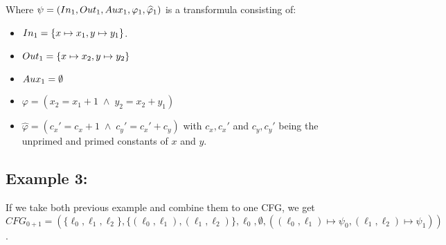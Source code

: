 \documentclass{article}
\begin{document}
	Where $\psi = (In_1, Out_1, Aux_1, \varphi_1, \widehat{\varphi}_1)$ is a transformula consisting of: 
	\begin{itemize}
		\item $In_1 = \{x \mapsto x_1, y \mapsto y_1 \}$.
		\item $Out_1 = \{ x \mapsto x_2, y \mapsto y_2 \}$
		\item $Aux_1 = \emptyset $
		\item $	\varphi = ( x_{2} = x_{1} + 1 \; \land \; y_{2} = x_{2} + y_{1} ) $
		\item $\widehat{\varphi} = ( c_{x}' = c_x + 1 \;\land\; c_{y}' = c_{x}' + c_y ) $ with $c_x, c_x'$ and $c_y, c_y'$ being the unprimed and primed constants of $x$ and $y$.
	\end{itemize}
    
	
	\subsection*{Example 3:}
	If we take both previous example and combine them to one CFG, we get \\ $CFG_{0+1} = (\{ \ell_0, \ell_1, \ell_2\}, \{ (\ell_0, \ell_1), (\ell_1, \ell_2)\}, \ell_0, \emptyset, ((\ell_0, \ell_1) \mapsto \psi_0, (\ell_1, \ell_2) \mapsto \psi_1))$.
\end{document}
